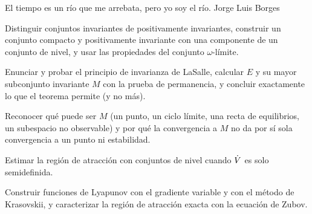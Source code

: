 
  {El tiempo es un río que me arrebata, pero yo soy el río.}
  {Jorge Luis Borges}

\begin{objetivos}
  \item Distinguir conjuntos invariantes de positivamente invariantes, construir un conjunto compacto y positivamente invariante con una componente de un conjunto de nivel, y usar las propiedades del conjunto $\omega$-límite.
  \item Enunciar y probar el principio de invarianza de LaSalle, calcular $E$ y su mayor subconjunto invariante $M$ con la prueba de permanencia, y concluir exactamente lo que el teorema permite (y no más).
  \item Reconocer qué puede ser $M$ (un punto, un ciclo límite, una recta de equilibrios, un subespacio no observable) y por qué la convergencia a $M$ no da por sí sola convergencia a un punto ni estabilidad.
  \item Estimar la región de atracción con conjuntos de nivel cuando $\dot V$ es solo semidefinida.
  \item Construir funciones de Lyapunov con el gradiente variable y con el método de Krasovskii, y caracterizar la región de atracción exacta con la ecuación de Zubov.
\end{objetivos}










